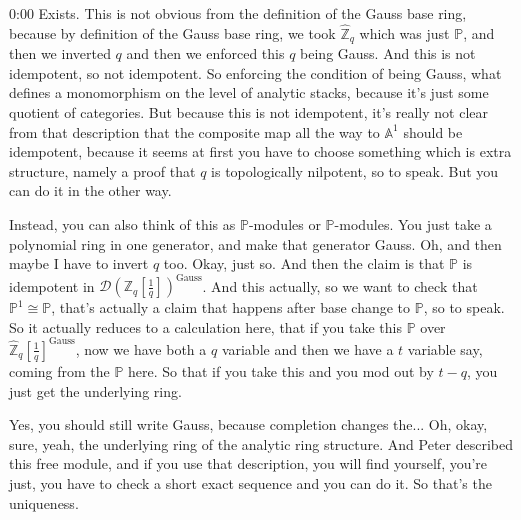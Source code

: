 \begin{unfinished}{0:00}
Exists. This is not obvious from the definition of the Gauss base ring, because by definition of the Gauss base ring, we took $\widehat{\mathbb{Z}}_q$ which was just $\mathbb{P}$, and then we inverted $q$ and then we enforced this $q$ being Gauss. And this is not idempotent, so not idempotent. So enforcing the condition of being Gauss, what defines a monomorphism on the level of analytic stacks, because it's just some quotient of categories. But because this is not idempotent, it's really not clear from that description that the composite map all the way to $\mathbb{A}^1$ should be idempotent, because it seems at first you have to choose something which is extra structure, namely a proof that $q$ is topologically nilpotent, so to speak. But you can do it in the other way.

Instead, you can also think of this as $\mathbb{P}$-modules or $\mathbb{P}$-modules. You just take a polynomial ring in one generator, and make that generator Gauss. Oh, and then maybe I have to invert $q$ too. Okay, just so. And then the claim is that $\mathbb{P}$ is idempotent in $\mathcal{D}(\mathbb{Z}_q[\frac{1}{q}])^{\mathrm{Gauss}}$. And this actually, so we want to check that $\mathbb{P}^1 \cong \mathbb{P}$, that's actually a claim that happens after base change to $\mathbb{P}$, so to speak. So it actually reduces to a calculation here, that if you take this $\mathbb{P}$ over $\widehat{\mathbb{Z}}_q[\frac{1}{q}]^{\mathrm{Gauss}}$, now we have both a $q$ variable and then we have a $t$ variable say, coming from the $\mathbb{P}$ here. So that if you take this and you mod out by $t-q$, you just get the underlying ring.

Yes, you should still write Gauss, because completion changes the... Oh, okay, sure, yeah, the underlying ring of the analytic ring structure. And Peter described this free module, and if you use that description, you will find yourself, you're just, you have to check a short exact sequence and you can do it. So that's the uniqueness.


\end{unfinished}
